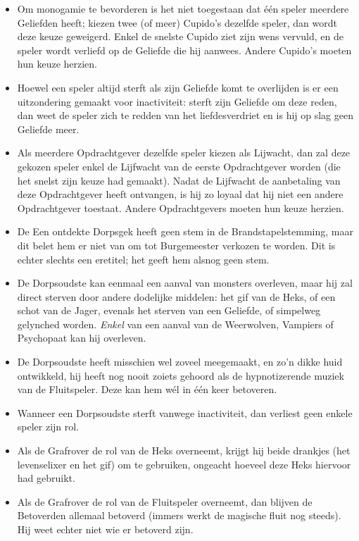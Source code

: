 \documentclass[12pt]{article}
\begin{document}
    \begin{itemize}
  	\item Om monogamie te bevorderen is het niet toegestaan dat \'e\'en speler meerdere Geliefden heeft; kiezen twee (of meer) Cupido's dezelfde speler, dan wordt deze keuze geweigerd. Enkel de snelste Cupido ziet zijn wens vervuld, en de speler wordt verliefd op de Geliefde die hij aanwees. Andere Cupido's moeten hun keuze herzien.
  	\item Hoewel een speler altijd sterft als zijn Geliefde komt te overlijden is er een uitzondering gemaakt voor inactiviteit: sterft zijn Geliefde om deze reden, dan weet de speler zich te redden van het liefdesverdriet en is hij op slag geen Geliefde meer.
  	\item Als meerdere Opdrachtgever dezelfde speler kiezen als Lijwacht, dan zal deze gekozen speler enkel de Lijfwacht van de eerste Opdrachtgever worden (die het snelst zijn keuze had gemaakt). Nadat de Lijfwacht de aanbetaling van deze Opdrachtgever heeft ontvangen, is hij zo loyaal dat hij niet een andere Opdrachtgever toestaat. Andere Opdrachtgevers moeten hun keuze herzien.
  \item De Een ontdekte Dorpsgek heeft geen stem in de Brandstapelstemming, maar dit belet hem er niet van om tot Burgemeester verkozen te worden. Dit is echter slechts een eretitel; het geeft hem alsnog geen stem.
  	\item De Dorpsoudste kan eenmaal een aanval van monsters overleven, maar hij zal direct sterven door andere dodelijke middelen: het gif van de Heks, of een schot van de Jager, evenals het sterven van een Geliefde, of simpelweg gelynched worden. \emph{Enkel} van een aanval van de Weerwolven, Vampiers of Psychopaat kan hij overleven.
  	\item De Dorpsoudste heeft misschien wel zoveel meegemaakt, en zo'n dikke huid ontwikkeld, hij heeft nog nooit zoiets gehoord als de hypnotizerende muziek van de Fluitspeler. Deze kan hem w\'el in \'e\'en keer betoveren.
  	\item Wanneer een Dorpsoudste sterft vanwege inactiviteit, dan verliest geen enkele speler zijn rol.
  	\item Als de Grafrover de rol van de Heks overneemt, krijgt hij beide drankjes (het levenselixer en het gif) om te gebruiken, ongeacht hoeveel deze Heks hiervoor had gebruikt.
  	\item Als de Grafrover de rol van de Fluitspeler overneemt, dan blijven de Betoverden allemaal betoverd (immers werkt de magische fluit nog steeds). Hij weet echter niet wie er betoverd zijn.

\end{itemize}
\end{document}
